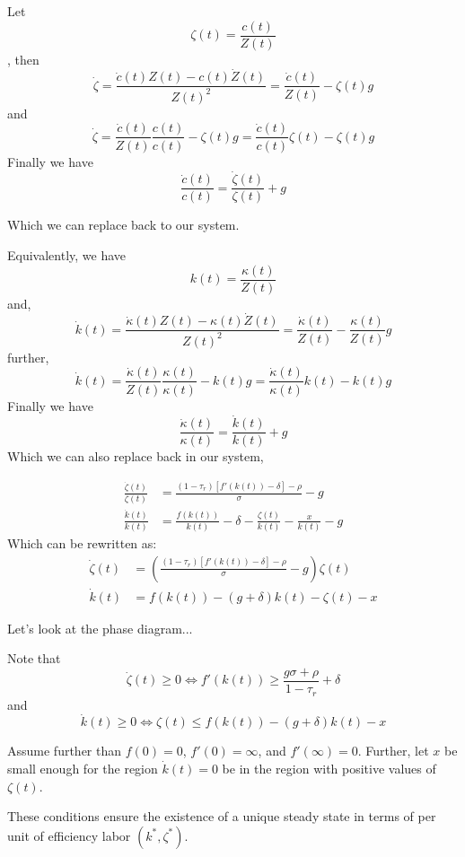 \documentclass[aspectratio=169]{beamer}
\begin{document}
\begin{frame}

Let \[\zeta(t)=\frac{c(t)}{Z(t)}\], then \[\dot{\zeta}=\frac{\dot{c}(t)Z(t)-c(t)\dot{Z}(t)}{Z(t)^2}=\frac{\dot{c}(t)}{Z(t)}-\zeta(t)g\] and 
\[\dot{\zeta}=\frac{\dot{c}(t)}{Z(t)}\frac{c(t)}{c(t)}-\zeta(t)g=\frac{\dot{c}(t)}{c(t)}\zeta(t)-\zeta(t)g\]
Finally we have \[\frac{\dot{c}(t)}{c(t)}=\frac{\dot{\zeta}(t)}{\zeta(t)}+g\]

Which we can replace back to our system.
\end{frame}

\begin{frame}
    Equivalently, we have \[k(t)=\frac{\kappa(t)}{Z(t)}\] and, \[\dot{k}(t)=\frac{\dot{\kappa}(t)Z(t)-\kappa(t)\dot{Z}(t)}{Z(t)^2}=\frac{\dot{\kappa}(t)}{Z(t)}-\frac{\kappa(t)}{Z(t)}g\]
    further,
    \[\dot{k}(t)=\frac{\dot{\kappa}(t)}{Z(t)}\frac{\kappa(t)}{\kappa(t)}-k(t)g=\frac{\dot{\kappa}(t)}{\kappa(t)}k(t)-k(t)g\]
    Finally we have
    \[\frac{\dot{\kappa}(t)}{\kappa(t)}=\frac{\dot{k}(t)}{k(t)}+g\]
    Which we can also replace back in our system,
\end{frame}


\begin{frame}
    \begin{align}
        \frac{\dot{\zeta}(t)}{\zeta(t)}&=\frac{(1-\tau_r)[f'(k(t))-\delta]-\rho}{\sigma}-g\\
        \frac{\dot{k}(t)}{k(t)} &= \frac{f(k(t))}{k(t)}-\delta-\frac{\zeta(t)}{k(t)}-\frac{x}{k(t)}-g
    \end{align}
    Which can be rewritten as:
    \begin{align}
        \dot{\zeta}(t) &= \left(\frac{(1-\tau_r)[f'(k(t))-\delta]-\rho}{\sigma}-g\right)\zeta(t)\\
        \dot{k}(t)&=f(k(t))-(g+\delta)k(t)-\zeta(t)-x
    \end{align}
    
    Let's look at the phase diagram...
\end{frame}

\begin{frame}
    Note that \[\dot{\zeta}(t)\geq 0 \Leftrightarrow f'(k(t))\geq \frac{g\sigma+\rho}{1-\tau_r}+\delta \] and
    \[\dot{k}(t)\geq0\Leftrightarrow \zeta(t)\leq f(k(t))-(g+\delta)k(t)-x\]
    
    Assume further than $f(0)=0$, $f'(0)=\infty$, and $f'(\infty)=0$. Further, let $x$ be small enough for the region $\dot{k}(t)=0$ be in the region with positive values of $\zeta(t)$.
    
    These conditions ensure the existence of a unique steady state in terms of per unit of efficiency labor $(k^*,\zeta^*)$.
\end{frame}
\end{document}
